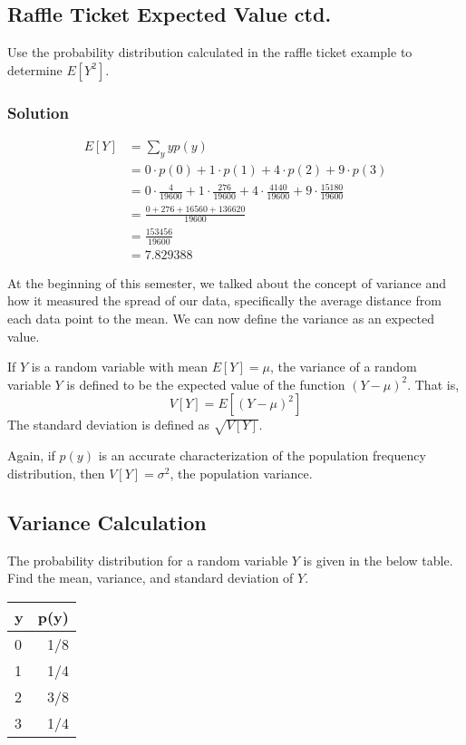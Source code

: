 \documentclass[11pt]{article}
\theoremstyle{definition}
\begin{document}
\subsection{Raffle Ticket Expected Value ctd.}

Use the probability distribution calculated in the raffle ticket example to determine $E[Y^2]$.

\subsubsection*{Solution}

$$
	\begin{aligned}
		E[Y] & = \sum_y yp(y) \\
		& = 0 \cdot p(0) + 1 \cdot p(1) + 4 \cdot p(2) + 9 \cdot p(3) \\
		& = 0 \cdot \frac{4}{19600} + 1 \cdot \frac{276}{19600} + 4 \cdot \frac{4140}{19600} + 9 \cdot \frac{15180}{19600} \\
		& = \frac{0 + 276 + 16560 + 136620}{19600} \\
		& = \frac{153456}{19600} \\
		& = 7.829388
	\end{aligned}
$$

At the beginning of this semester, we talked about the concept of variance and how it measured the spread of our data, specifically the average distance from each data point to the mean. We can now define the variance as an expected value.

\begin{shaded}
	If $Y$ is a random variable with mean $E[Y]=\mu$, the variance of a random variable $Y$ is defined to be the expected value of the function $(Y-\mu)^2$. That is,
	$$
		V[Y] = E[(Y-\mu)^2]
	$$
	The standard deviation is defined as $\sqrt{V[Y]}$.
\end{shaded}

Again, if $p(y)$ is an accurate characterization of the population frequency distribution, then $V[Y]=\sigma^2$, the population variance.

\subsection{Variance Calculation}

The probability distribution for a random variable $Y$ is given in the below table. Find the mean, variance, and standard deviation of $Y$.

\begin{table}[h]
	\centering
	\begin{tabular}{lr}
		\hline
		y & p(y) \\
		\hline
		0 & 1/8 \\
		1 & 1/4 \\
		2 & 3/8 \\
		3 & 1/4 \\
		\hline
	\end{tabular}
\end{table}
\end{document}

